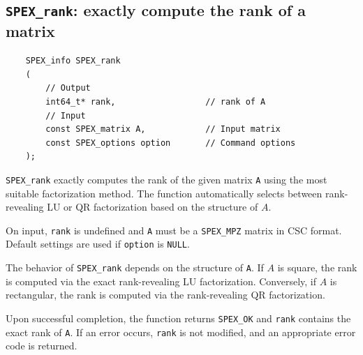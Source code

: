 \documentclass[12pt,oneside]{book}
\theoremstyle{definition}
\begin{document}
\subsection{\texttt{SPEX\_rank}: exactly compute the rank of a matrix}
\begin{mdframed}[userdefinedwidth=\textwidth]
{\footnotesize
\begin{verbatim}
    SPEX_info SPEX_rank
    (
        // Output
        int64_t* rank,                  // rank of A
        // Input
        const SPEX_matrix A,            // Input matrix
        const SPEX_options option       // Command options
    );
\end{verbatim}
} \end{mdframed}

\verb|SPEX_rank| exactly computes the rank of the given matrix \verb|A| using the
most suitable factorization method. The function automatically selects between
rank-revealing LU or QR factorization based on the structure of $A$.

On input, \verb|rank| is undefined and \verb|A| must be a \verb|SPEX_MPZ|
matrix in CSC format. Default settings are used if \verb|option| is \verb|NULL|.

The behavior of \verb|SPEX_rank| depends on the structure of \verb|A|. If $A$ is
square, the rank is computed via the exact rank-revealing LU factorization.
Conversely, if $A$ is rectangular, the rank is computed via the rank-revealing
QR factorization.

Upon successful completion, the function returns \verb|SPEX_OK| and \verb|rank|
contains the exact rank of \verb|A|. If an error occurs, \verb|rank| is not
modified, and an appropriate error code is returned.
\end{document}
